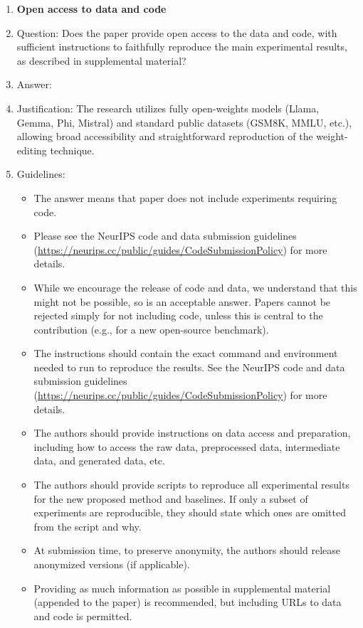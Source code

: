 \documentclass{article}
\begin{document}
\begin{enumerate}
\item {\bf Open access to data and code}
    \item[] Question: Does the paper provide open access to the data and code, with sufficient instructions to faithfully reproduce the main experimental results, as described in supplemental material?
    \item[] Answer: \answerYes{}
    \item[] Justification: The research utilizes fully open-weights models (Llama, Gemma, Phi, Mistral) and standard public datasets (GSM8K, MMLU, etc.), allowing broad accessibility and straightforward reproduction of the weight-editing technique. 
    \item[] Guidelines:
    \begin{itemize}
        \item The answer \answerNA{} means that paper does not include experiments requiring code.
        \item Please see the NeurIPS code and data submission guidelines (\url{https://neurips.cc/public/guides/CodeSubmissionPolicy}) for more details.
        \item While we encourage the release of code and data, we understand that this might not be possible, so \answerNo{} is an acceptable answer. Papers cannot be rejected simply for not including code, unless this is central to the contribution (e.g., for a new open-source benchmark).
        \item The instructions should contain the exact command and environment needed to run to reproduce the results. See the NeurIPS code and data submission guidelines (\url{https://neurips.cc/public/guides/CodeSubmissionPolicy}) for more details.
        \item The authors should provide instructions on data access and preparation, including how to access the raw data, preprocessed data, intermediate data, and generated data, etc.
        \item The authors should provide scripts to reproduce all experimental results for the new proposed method and baselines. If only a subset of experiments are reproducible, they should state which ones are omitted from the script and why.
        \item At submission time, to preserve anonymity, the authors should release anonymized versions (if applicable).
        \item Providing as much information as possible in supplemental material (appended to the paper) is recommended, but including URLs to data and code is permitted.
    \end{itemize}



\end{enumerate}
\end{document}
